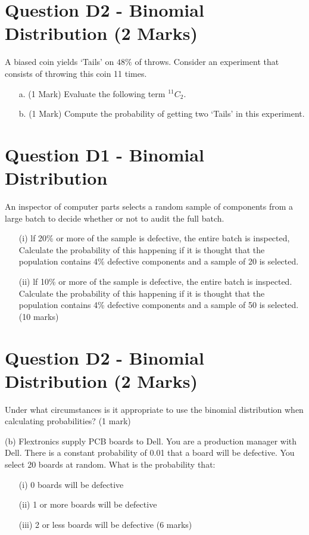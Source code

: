 \documentclass[]{report}
\begin{document}
	
\section{Question D2 - Binomial Distribution (2 Marks) } %
A biased coin yields `Tails' on $48\%$ of throws. Consider an experiment that consists of throwing this coin 11 times.
\begin{itemize}
	\item[a.] (1 Mark) Evaluate the following term $^{11}C_2$.
	\item[b.] (1 Mark) Compute the probability of getting two `Tails' in this experiment.
\end{itemize}

\section{Question D1 - Binomial Distribution } %
An inspector of computer parts selects a random sample of components
from a large batch to decide whether or not to audit the full batch.

\begin{itemize}
	\item[(i)] lf 20\% or more of the sample is defective, the entire batch is
	inspected, Calculate the probability of this happening if it is
	thought that the population contains 4\% defective components and
	a sample of 20 is selected.
	\item[(ii)] lf 10\% or more of the sample is defective, the entire batch is
	inspected. Calculate the probability of this happening if it is
	thought that the population contains 4\% defective components and
	a sample of 50 is selected.
	(10 marks)
\end{itemize}


\section{Question D2 - Binomial Distribution (2 Marks) } %
Under what circumstances is it appropriate to use the binomial distribution when calculating probabilities?					(1 mark)

(b) 	Flextronics supply PCB boards to Dell.  You are a production manager with Dell.  There is a constant probability of 0.01 that a board will be defective.  You select 20 boards at random.  What is the probability that:
\begin{itemize}
	\item[(i)]	0 boards will be defective
	\item[(ii)]	1 or more boards will be defective
	\item[(iii)]	2 or less boards will be defective			
	(6 marks)
\end{itemize}
\end{document}
